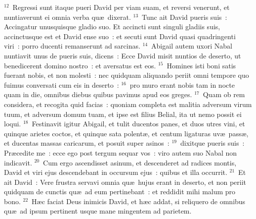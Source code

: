 ${}^{12}$~Regressi sunt itaque pueri David per viam suam, et reversi venerunt, et nuntiaverunt ei omnia verba qu\ae\ dixerat.
${}^{13}$~Tunc ait David pueris suis~: Accingatur unusquisque gladio suo. Et accincti sunt singuli gladiis suis, accinctusque est et David ense suo~: et secuti sunt David quasi quadringenti viri~: porro ducenti remanserunt ad sarcinas.
${}^{14}$~Abigail autem uxori Nabal nuntiavit unus de pueris suis, dicens~: Ecce David misit nuntios de deserto, ut benedicerent domino nostro~: et aversatus est eos.
${}^{15}$~Homines isti boni satis fuerant nobis, et non molesti~: nec quidquam aliquando periit omni tempore quo fuimus conversati cum eis in deserto~:
${}^{16}$~pro muro erant nobis tam in nocte quam in die, omnibus diebus quibus pavimus apud eos greges.
${}^{17}$~Quam ob rem considera, et recogita quid facias~: quoniam completa est malitia adversum virum tuum, et adversum domum tuam, et ipse est filius Belial, ita ut nemo possit ei loqui.
${}^{18}$~Festinavit igitur Abigail, et tulit ducentos panes, et duos utres vini, et quinque arietes coctos, et quinque sata polent\ae , et centum ligaturas uv\ae\ pass\ae , et ducentas massas caricarum, et posuit super asinos~:
${}^{19}$~dixitque pueris suis~: Pr\ae cedite me~: ecce ego post tergum sequar vos~: viro autem suo Nabal non indicavit.
${}^{20}$~Cum ergo ascendisset asinum, et descenderet ad radices montis, David et viri ejus descendebant in occursum ejus~: quibus et illa occurrit.
${}^{21}$~Et ait David~: Vere frustra servavi omnia qu\ae\ hujus erant in deserto, et non periit quidquam de cunctis qu\ae\ ad eum pertinebant~: et reddidit mihi malum pro bono.
${}^{22}$~H\ae c faciat Deus inimicis David, et h\ae c addat, si reliquero de omnibus qu\ae\ ad ipsum pertinent usque mane mingentem ad parietem.


